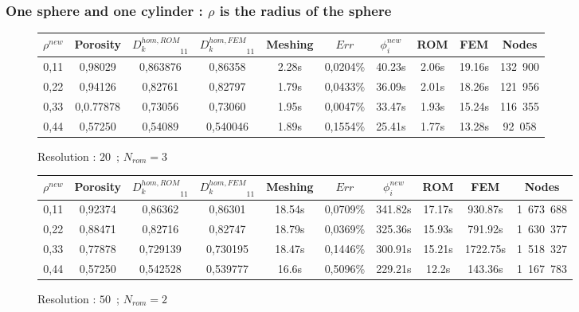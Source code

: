 \subsubsection{One sphere and one cylinder : $\rho$ is the radius of the sphere}

\begin{figure}[H]%
%
\begin{center}
\begin{tabular}{|c|c||c|c||c|c||c|c||c||c|}
\hline
\rowcolor{lightgray} $\rho^{new}$&Porosity&${D_k^{hom,ROM}}_{11}$&${D_k^{hom,FEM}}_{11}$&Meshing&$Err$&$\phi_i^{new}$&ROM&FEM&Nodes\\
\hline
0,11&0,98029&0,863876&0,86358&2.28s&0,0204\%&40.23s&2.06s&19.16s&132\ 900\\
\hline
0,22&0,94126&0,82761&0,82797&1.79s&0,0433\%&36.09s&2.01s&18.26s&121\ 956\\
\hline
0,33&0,0.77878&0,73056&0,73060&1.95s&0,0047\%&33.47s&1.93s&15.24s&116\ 355\\
\hline
0,44&0,57250&0,54089&0,540046&1.89s&0,1554\%&25.41s&1.77s&13.28s&92\ 058\\
\hline
\end{tabular}
\end{center}
\caption{Resolution : $20$\ ; $N_{rom}=3$}
%
\end{figure}

\begin{figure}[H]%
%
\begin{center}
\begin{tabular}{|c|c||c|c||c|c||c|c||c||c|}
\hline
\rowcolor{lightgray} $\rho^{new}$&Porosity&${D_k^{hom,ROM}}_{11}$&${D_k^{hom,FEM}}_{11}$&Meshing&$Err$&$\phi_i^{new}$&ROM&FEM&Nodes\\
\hline
0,11&0,92374&0,86362&0,86301&18.54s&0,0709\%&341.82s&17.17s&930.87s&1\ 673\ 688\\
\hline
0,22&0,88471&0,82716&0,82747&18.79s&0,0369\%&325.36s&15.93s&791.92s&1\ 630\ 377\\
\hline
0,33&0,77878&0,729139&0,730195&18.47s&0,1446\%&300.91s&15.21s&1722.75s&1\ 518\ 327\\
\hline
0,44&0,57250&0,542528&0,539777&16.6s&0,5096\%&229.21s&12.2s&143.36s&1\ 167\ 783\\
\hline
\end{tabular}
\end{center}
\caption{Resolution : $50$\ ; $N_{rom}=2$}
%
\end{figure}

\ligneinter

